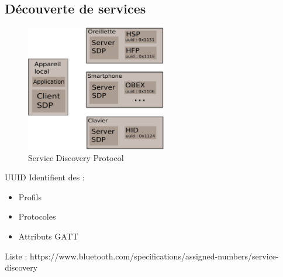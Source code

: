 \subsection{Découverte de services}
\begin{frame}
\begin{minipage}[t]{0.70\linewidth}

\begin{figure}
\includegraphics[height=5.5cm]{sdp.png}
\caption{Service Discovery Protocol}
\end{figure}


\end{minipage}
\begin{minipage}[t]{0.27\linewidth}
\begin{block}{UUID}
Identifient des :
\begin{itemize}
\item Profils
\item Protocoles
\item Attributs GATT
\end{itemize}
\end{block}

\end{minipage}
{\tiny Liste : https://www.bluetooth.com/specifications/assigned-numbers/service-discovery}
\end{frame}

